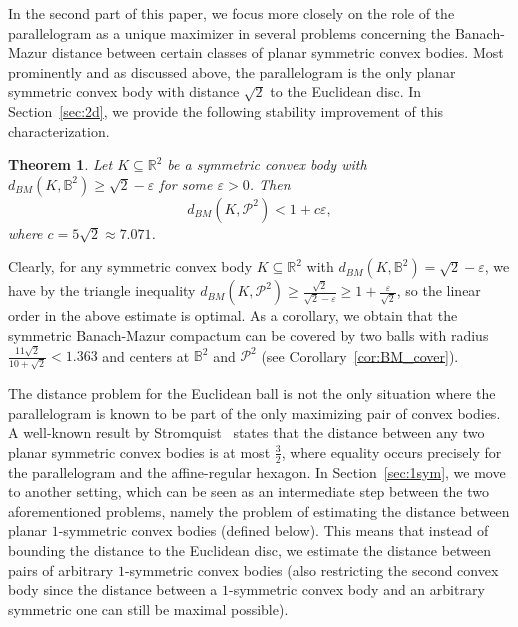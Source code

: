 \documentclass[12pt,a4paper]{article}
\newtheorem{twr}{Theorem}[section]
\theoremstyle{definition}
\newcommand\R{\mathbb{R}}
\newcommand\B{\mathbb{B}}
\newcommand\CP{\mathcal{P}}
\begin{document}
In the second part of this paper, we focus more closely on the role of the parallelogram as a unique maximizer in several problems concerning the Banach-Mazur distance between certain classes of planar symmetric convex bodies. Most prominently and as discussed above, the parallelogram is the only planar symmetric convex body with distance $\sqrt{2}$ to the Euclidean disc. In Section~\ref{sec:2d}, we provide the following stability improvement of this characterization.



\begin{twr}
\label{thm:stability}
Let $K \subseteq \R^2$ be a symmetric convex body with $d_{BM}(K,\B^2) \geq \sqrt{2} - \varepsilon$ for some $\varepsilon > 0$. Then
$$ d_{BM}(K,\CP^2) < 1 + c \varepsilon, $$
where $c = 5 \sqrt{2} \approx 7.071$.
\end{twr}



Clearly, for any symmetric convex body $K \subseteq \R^2$ with $d_{BM}(K, \B^2) = \sqrt{2} - \varepsilon$, we have by the triangle inequality $d_{BM}(K, \CP^2) \geq \frac{\sqrt{2}}{\sqrt{2}-\varepsilon} \geq 1 + \frac{\varepsilon}{\sqrt{2}}$, so the linear order in the above estimate is optimal. As a corollary, we obtain that the symmetric Banach-Mazur compactum can be covered by two balls with radius $\frac{11 \sqrt{2}}{10 + \sqrt{2}} < 1.363$ and centers at $\B^2$ and $\CP^2$ (see Corollary~\ref{cor:BM_cover}).
\newpage

The distance problem for the Euclidean ball is not the only situation where the parallelogram is known to be part of the only maximizing pair of convex bodies. A well-known result by Stromquist~\cite{stromquist} states that the distance between any two planar symmetric convex bodies is at most $\frac{3}{2}$, where equality occurs precisely for the parallelogram and the affine-regular hexagon. In Section~\ref{sec:1sym}, we move to another setting, which can be seen as an intermediate step between the two aforementioned problems, namely the problem of estimating the distance between planar $1$-symmetric convex bodies (defined below). This means that instead of bounding the distance to the Euclidean disc, we estimate the distance between pairs of arbitrary $1$-symmetric convex bodies (also restricting the second convex body since the distance between a $1$-symmetric convex body and an arbitrary symmetric one can still be maximal possible).
\end{document}
